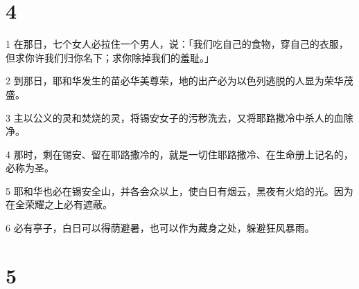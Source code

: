 \chapter{4}

\par 1 在那日，七个女人必拉住一个男人，说：「我们吃自己的食物，穿自己的衣服，但求你许我们归你名下；求你除掉我们的羞耻。」
\par 2 到那日，耶和华发生的苗必华美尊荣，地的出产必为以色列逃脱的人显为荣华茂盛。
\par 3 主以公义的灵和焚烧的灵，将锡安女子的污秽洗去，又将耶路撒冷中杀人的血除净。
\par 4 那时，剩在锡安、留在耶路撒冷的，就是一切住耶路撒冷、在生命册上记名的，必称为圣。
\par 5 耶和华也必在锡安全山，并各会众以上，使白日有烟云，黑夜有火焰的光。因为在全荣耀之上必有遮蔽。
\par 6 必有亭子，白日可以得荫避暑，也可以作为藏身之处，躲避狂风暴雨。

\chapter{5}

